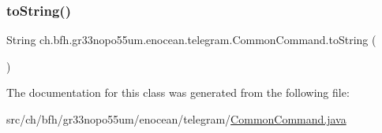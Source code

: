 \hypertarget{classch_1_1bfh_1_1gr33nopo55um_1_1enocean_1_1telegram_1_1_common_command_a0d6c632da164320eb0d0e1cc67cf2059}{}\label{classch_1_1bfh_1_1gr33nopo55um_1_1enocean_1_1telegram_1_1_common_command_a0d6c632da164320eb0d0e1cc67cf2059} 
\subsubsection{\texorpdfstring{to\+String()}{toString()}}
{\footnotesize\ttfamily String ch.\+bfh.\+gr33nopo55um.\+enocean.\+telegram.\+Common\+Command.\+to\+String (\begin{DoxyParamCaption}{ }\end{DoxyParamCaption})}



The documentation for this class was generated from the following file\+:\begin{DoxyCompactItemize}
\item 
src/ch/bfh/gr33nopo55um/enocean/telegram/\hyperlink{_common_command_8java}{Common\+Command.\+java}\end{DoxyCompactItemize}
